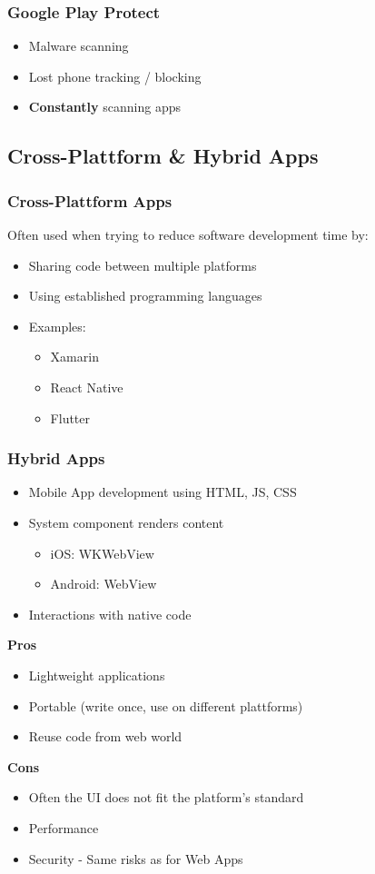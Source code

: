 \subsubsection{Google Play Protect}
\begin{itemize}
    \item Malware scanning
    \item Lost phone tracking / blocking
    \item \textbf{Constantly} scanning apps
\end{itemize}

\subsection{Cross-Plattform \& Hybrid Apps}
\subsubsection{Cross-Plattform Apps}
Often used when trying to reduce software development time by:
\begin{itemize}
    \item Sharing code between multiple platforms
    \item Using established programming languages
    \item Examples:
    \begin{itemize}
        \item Xamarin
        \item React Native
        \item Flutter
    \end{itemize}
\end{itemize}

\subsubsection{Hybrid Apps}
\begin{itemize}
    \item Mobile App development using HTML, JS, CSS
    \item System component renders content
    \begin{itemize}
        \item iOS: WKWebView
        \item Android: WebView
    \end{itemize}
    \item Interactions with native code
\end{itemize}
\textbf{Pros}
\begin{itemize}
    \item Lightweight applications
    \item Portable (write once, use on different plattforms)
    \item Reuse code from web world
\end{itemize}
\textbf{Cons}
\begin{itemize}
    \item Often the UI does not fit the platform's standard
    \item Performance
    \item Security - Same risks as for Web Apps
\end{itemize}

